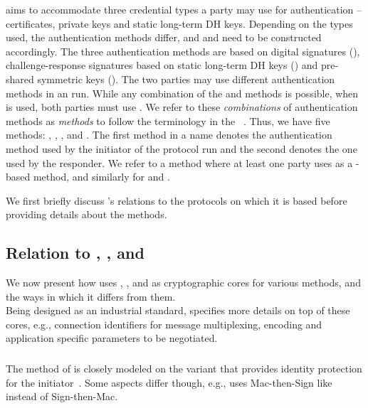 \mEdhoc{} aims to accommodate three credential types
a party may use for authentication -- certificates, private keys
and static long-term DH keys.
%
Depending on the types used, the authentication methods differ,
and \mAuthi{} and \mAuthr{} need to be constructed accordingly.
%
The three authentication methods are based on digital signatures (\mSig),
challenge-response signatures based on static long-term DH keys (\mStat) and
pre-shared symmetric keys (\mPsk).
%
The two parties may use different authentication methods in an \mEdhoc{} run.
%
While any combination of the \mSig{} and \mStat{} methods is possible,
when \mPsk{} is used, both parties must use \mPsk{}.
%
We refer to these \emph{combinations} of authentication methods as
\emph{methods} to follow the terminology in the
\mSpec{}~\cite{selander-lake-edhoc-01}.
%
Thus, we have five methods: \mSigSig, \mSigStat, \mStatStat, \mStatSig{} and
\mPskPsk.
%
The first method in a name denotes the
authentication method used by the initiator of the protocol run and the second denotes the
one used by the responder.
%
We refer to a method where at least one party uses \mSig{} as a \mSig-based
method, and similarly for \mStat{} and \mPsk.
%

We first briefly discuss \mEdhoc's relations to the protocols on which it is
based before providing details about the methods.
%

\subsection{Relation to \mSigma, \mOptls{}, and \mNoise{}}
\label{sec:relationsToOtherProtocols}
We now present how \mEdhoc{} uses \mSigma, \mOptls{}, and \mNoise{} as
cryptographic cores for various methods, and the ways in which it differs from them.
\\
%
Being designed as an industrial standard, \mEdhoc{} specifies more details
on top of these cores, e.g., connection identifiers for message multiplexing,
encoding and application specific parameters to be negotiated.
%

\subsubsection{\mSigma{}}
\label{sec:sigma}
The \mSigSig{} method of \mEdhoc{} is closely modeled on the \mSigma{}
variant that provides identity protection for the initiator~\cite{sigma}.
%
Some aspects differ though, e.g., \mSigSig{} uses Mac-then-Sign like
\mTls{} instead of Sign-then-Mac. 
%

